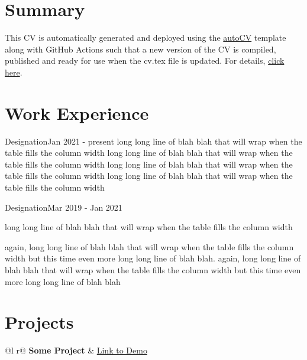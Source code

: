 
\section{Summary}
This CV is automatically generated and deployed using the \href{https://github.com/jitinnair1/autoCV}{autoCV} template along with GitHub Actions such that a new version of the CV is compiled, published and ready for use when the cv.tex file is updated. For details, \href{https://github.com/jitinnair1/autoCV}{click here}.

\section{Work Experience}

\begin{jobshort}{Designation}{Jan 2021 - present}
long long line of blah blah that will wrap when the table fills the column width long long line of blah blah that will wrap when the table fills the column width long long line of blah blah that will wrap when the table fills the column width long long line of blah blah that will wrap when the table fills the column width
\end{jobshort}


\begin{joblong}{Designation}{Mar 2019 - Jan 2021}
\item long long line of blah blah that will wrap when the table fills the column width
\item again, long long line of blah blah that will wrap when the table fills the column width but this time even more long long line of blah blah. again, long long line of blah blah that will wrap when the table fills the column width but this time even more long long line of blah blah
\end{joblong}
  
\section{Projects}

\begin{tabularx}{\linewidth}{ @{}l r@{} }
\textbf{Some Project} & \hfill \href{https://some-link.com}{Link to Demo} \\[3.75pt]
  \\
\end{tabularx}

